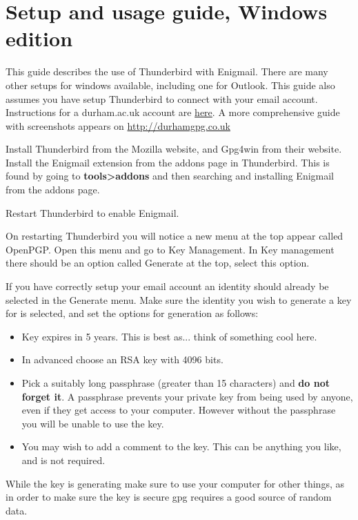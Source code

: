 \section{Setup and usage guide, Windows edition}

This guide describes the use of Thunderbird with Enigmail. There are many other setups for windows available, including one for Outlook. This guide also assumes you have setup Thunderbird to connect with your email account. Instructions for a durham.ac.uk account are \href{http://www.dur.ac.uk/cis/email/exchange/eximap/configuring-clients/}{here}. A more comprehensive guide with screenshots appears on \href{http://durhamgpg.co.uk}{http://durhamgpg.co.uk}

\begin{compactenum}[1.]
    \item Install Thunderbird from the Mozilla website, and Gpg4win from their website. Install the Enigmail extension from the addons page in Thunderbird. This is found by going to \textbf{tools>addons} and then searching and installing Enigmail from the addons page.
    \item Restart Thunderbird to enable Enigmail.
    \item On restarting Thunderbird you will notice a new menu at the top appear called OpenPGP. Open this menu and go to Key Management. In Key management there should be an option called Generate at the top, select this option.
    \item If you have correctly setup your email account an identity should already be selected in the Generate menu. Make sure the identity you wish to generate a key for is selected, and set the options for generation as follows: 
        \begin{itemize}
            \item Key expires in 5 years. This is best as... think of something cool here.
            \item In advanced choose an RSA key with 4096 bits.
            \item Pick a suitably long passphrase (greater than 15 characters) and \textbf{do not forget it}. A passphrase prevents your private key from being used by anyone, even if they get access to your computer. However without the passphrase you will be unable to use the key.
            \item You may wish to add a comment to the key. This can be anything you like, and is not required.
        \end{itemize}
    \item While the key is generating make sure to use your computer for other things, as in order to make sure the key is secure gpg requires a good source of random data.

\end{compactenum}
